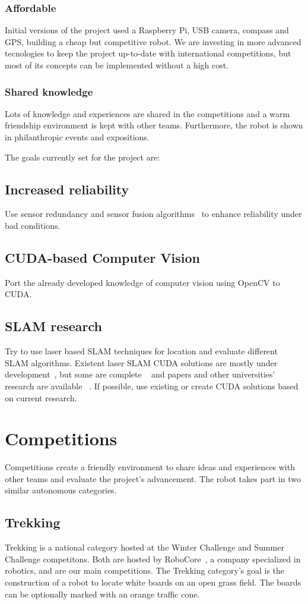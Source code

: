 \documentclass[conference]{IEEEtran}
\begin{document}
\subsubsection{Affordable}
Initial versions of the project used a Raspberry Pi, USB camera, compass and
GPS, building a cheap but competitive robot. We are investing in more advanced
tecnologies to keep the project up-to-date with international competitions, but
most of its concepts can be implemented without a high cost.
\subsubsection{Shared knowledge}
Lots of knowledge and experiences are shared in the competitions and a warm
friendship environment is kept with other teams. Furthermore, the robot is
shown in philanthropic events and expositions.

\medskip
The goals currently set for the project are:
\setcounter{subsection}{0}
\subsection{Increased reliability} Use sensor redundancy and sensor fusion
algorithms~\cite{kalman} to enhance reliability under bad conditions.
\subsection{CUDA-based Computer Vision} Port the already developed knowledge of
computer vision using OpenCV to CUDA.
\subsection{SLAM research} Try to use laser based SLAM techniques for
location and evaluate different SLAM algorithms. Existent laser SLAM CUDA
solutions are mostly under development~\cite{CUDA-PHDSLAM}, but some are complete
~\cite{rgbdslam_v2} and papers and other universities' research are available
~\cite{CUDA-IEEE}. If possible, use existing or create CUDA solutions based on current
research.

\section{Competitions}
\setcounter{subsection}{0}
Competitions create a friendly environment to share ideas and experiences with
other teams and evaluate the project's advancement. The robot takes part in two
similar autonomous categories.
\subsection{Trekking}
Trekking is a national category hosted at the Winter Challenge and Summer
Challenge competitons. Both are hosted by RoboCore~\cite{RoboCore}, a company
specialized in robotics, and are our main competitions. The Trekking category's
goal is the construction of a robot to locate white boards on an open grass field.
The boards can be optionally marked with an orange traffic cone.
\end{document}
